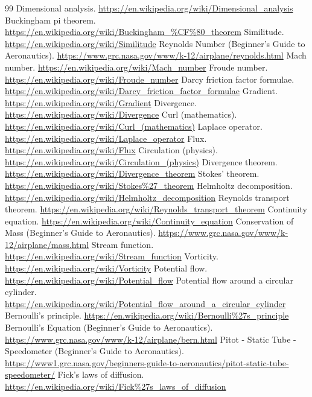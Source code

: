 \documentclass[10pt,openany]{book}
\begin{document}
\begin{thebibliography}{99}
 Dimensional analysis. \url{https://en.wikipedia.org/wiki/Dimensional_analysis}
 Buckingham pi theorem. \url{https://en.wikipedia.org/wiki/Buckingham_%CF%80_theorem}
 Similitude. \url{https://en.wikipedia.org/wiki/Similitude}
 Reynolds Number (Beginner's Guide to Aeronautics). \url{https://www.grc.nasa.gov/www/k-12/airplane/reynolds.html}
 Mach number. \url{https://en.wikipedia.org/wiki/Mach_number}
 Froude number. \url{https://en.wikipedia.org/wiki/Froude_number}
 Darcy friction factor formulae. \url{https://en.wikipedia.org/wiki/Darcy_friction_factor_formulae}
 Gradient. \url{https://en.wikipedia.org/wiki/Gradient}
 Divergence. \url{https://en.wikipedia.org/wiki/Divergence}
 Curl (mathematics). \url{https://en.wikipedia.org/wiki/Curl_(mathematics)}
 Laplace operator. \url{https://en.wikipedia.org/wiki/Laplace_operator}
 Flux. \url{https://en.wikipedia.org/wiki/Flux}
 Circulation (physics). \url{https://en.wikipedia.org/wiki/Circulation_(physics)}
 Divergence theorem. \url{https://en.wikipedia.org/wiki/Divergence_theorem}
 Stokes' theorem. \url{https://en.wikipedia.org/wiki/Stokes%27_theorem}
 Helmholtz decomposition. \url{https://en.wikipedia.org/wiki/Helmholtz_decomposition}
 Reynolds transport theorem. \url{https://en.wikipedia.org/wiki/Reynolds_transport_theorem}
 Continuity equation. \url{https://en.wikipedia.org/wiki/Continuity_equation}
 Conservation of Mass (Beginner's Guide to Aeronautics). \url{https://www.grc.nasa.gov/www/k-12/airplane/mass.html}
 Stream function. \url{https://en.wikipedia.org/wiki/Stream_function}
 Vorticity. \url{https://en.wikipedia.org/wiki/Vorticity}
 Potential flow. \url{https://en.wikipedia.org/wiki/Potential_flow}
 Potential flow around a circular cylinder. \url{https://en.wikipedia.org/wiki/Potential_flow_around_a_circular_cylinder}
 Bernoulli's principle. \url{https://en.wikipedia.org/wiki/Bernoulli%27s_principle}
 Bernoulli's Equation (Beginner's Guide to Aeronautics). \url{https://www.grc.nasa.gov/www/k-12/airplane/bern.html}
 Pitot - Static Tube - Speedometer (Beginner's Guide to Aeronautics). \url{https://www1.grc.nasa.gov/beginners-guide-to-aeronautics/pitot-static-tube-speedometer/}
 Fick's laws of diffusion. \url{https://en.wikipedia.org/wiki/Fick%27s_laws_of_diffusion}

\end{thebibliography}
\end{document}
